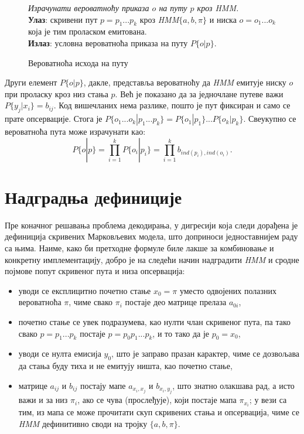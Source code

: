 \documentclass[12pt,oneside]{memoir}
\newenvironment{problem}[1][!ht]
{\renewcommand{\algorithmcfname}{Проблем}
\begin{figure}[!ht]
\centering
  \begin{minipage}{.94\linewidth}
	\begin{algorithm}[#1]%
  }{\end{algorithm}
  \end{minipage}
\end{figure}}
\begin{document}
\begin{CJK}{UTF8}{ipxm}
\begin{problem}[H]
  \SetAlgoLined
  \textit{Израчунати вероватноћу приказа $o$ на путу $p$ кроз \textit{HMM}.}\\
  \textbf{Улаз}: скривени пут $p = p_1...p_k$ кроз \textit{HMM}$\{a, b, \pi\}$ и ниска $o = o_1...o_k$ која је тим проласком емитована.\\
  \textbf{Излаз}: условна вероватноћа приказа на путу $P\{o | p\}$.
  \caption{Вероватноћа исхода на путу\cite{ba10b}}
  \label{prob:ishod}
\end{problem}

Други елемент $P\{o | p\}$, дакле, представља вероватноћу да \textit{HMM} емитује ниску $o$ при проласку кроз низ стања $p$. Већ је показано да за једночлане путеве важи $P\{y_j | x_i\} = b_{ij}$. Код вишечланих нема разлике, пошто је пут фиксиран и само се прате опсервације. Стога је $P\{o_1...o_k | p_1...p_k\} = P\{o_1 | p_1\}...P\{o_k | p_k\}$. Свеукупно се вероватноћа пута може израчунати као: $$P\{o | p\} = \prod_{i=1}^k P\{o_i | p_i\} = \prod_{i=1}^k b_{ind(p_i), ind(o_i)}.$$

\section{Надградња дефиниције}
Пре коначног решавања проблема декодирања, у дигресији која следи дорађена је дефиниција скривених Марковљевих модела, што доприноси једноставнијем раду са њима. Наиме, како би претходне формуле биле лакше за комбиновање и конкретну имплементацију, добро је на следећи начин надградити \textit{HMM} и сродне појмове попут скривеног пута и низа опсервација:
\begin{itemize}
  \item уводи се експлицитно почетно стање $x_0 = \pi$ уместо одвојених полазних вероватноћа $\pi$, чиме свако $\pi_i$ постаје део матрице прелаза $a_{0i}$,
  \item почетно стање се увек подразумева, као нулти члан скривеног пута, па тако свако $p = p_1...p_k$ постаје $p = p_0p_1...p_k$, и то тако да је $p_0 = x_0$,
  \item уводи се нулта емисија $y_0$, што је заправо празан карактер, чиме се дозвољава да стања буду тиха и не емитују ништа, као почетно стање,
  \item матрице $a_{ij}$ и $b_{ij}$ постају мапе $a_{x_i, x_j}$ и $b_{x_i, y_j}$, што знатно олакшава рад, а исто важи и за низ $\pi_i$, ако се чува (прослеђује), који постаје мапа $\pi_{x_i}$; у вези са тим, из мапа се може прочитати скуп скривених стања и опсервација, чиме се \textit{HMM} дефинитивно своди на тројку $\{a, b, \pi\}$.
\end{itemize}


\end{CJK}
\end{document}
